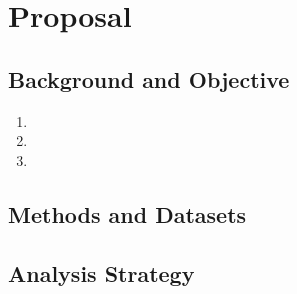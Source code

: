 \chapter{Proposal}




\section{Background and Objective}

\begin{enumerate}
    \item 
    \item 
    \item 
\end{enumerate}

\section{Methods and Datasets}


\section{Analysis Strategy}


